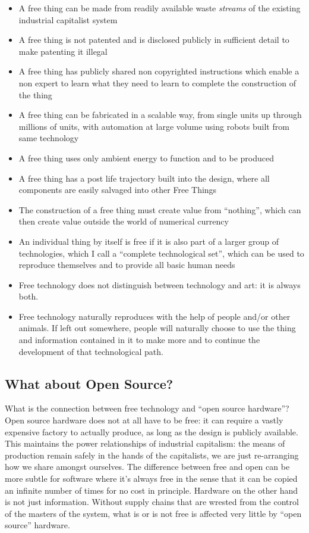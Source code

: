 \begin{itemize}
\item
  A free thing can be made from readily available waste \emph{streams}
  of the existing industrial capitalist system
\item
  A free thing is not patented and is disclosed publicly in sufficient
  detail to make patenting it illegal
\item
  A free thing has publicly shared non copyrighted instructions which
  enable a non expert to learn what they need to learn to complete the
  construction of the thing
\item
  A free thing can be fabricated in a scalable way, from single units up
  through millions of units, with automation at large volume using
  robots built from same technology
\item
  A free thing uses only ambient energy to function and to be produced
\item
  A free thing has a post life trajectory built into the design, where
  all components are easily salvaged into other Free Things
\item
  The construction of a free thing must create value from ``nothing'',
  which can then create value outside the world of numerical currency
\item
  An individual thing by itself is free if it is also part of a larger
  group of technologies, which I call a ``complete technological set'',
  which can be used to reproduce themselves and to provide all basic
  human needs
\item
  Free technology does not distinguish between technology and art: it is
  always both.
\item
  Free technology naturally reproduces with the help of people and/or
  other animals. If left out somewhere, people will naturally choose to
  use the thing and information contained in it to make more and to
  continue the development of that technological path.
\end{itemize}

\subsection{What about Open Source?}\label{what-about-open-source}

What is the connection between free technology and ``open source
hardware''? Open source hardware does not at all have to be free: it can
require a vastly expensive factory to actually produce, as long as the
design is publicly available. This maintains the power relationships of
industrial capitalism: the means of production remain safely in the
hands of the capitalists, we are just re-arranging how we share amongst
ourselves. The difference between free and open can be more subtle for
software where it's always free in the sense that it can be copied an
infinite number of times for no cost in principle. Hardware on the other
hand is not just information. Without supply chains that are wrested
from the control of the masters of the system, what is or is not free is
affected very little by ``open source'' hardware.


